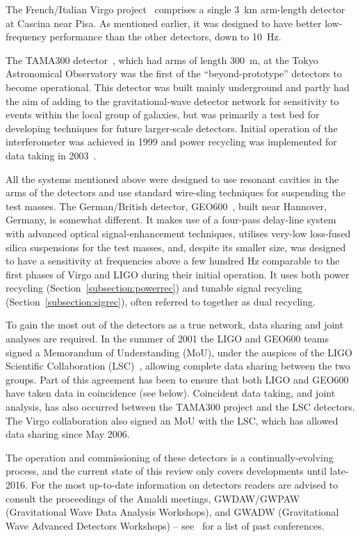 The French/Italian Virgo project~\cite{VIRGOweb, 2012JInst...7.3012A} comprises a single 3~km arm-length 
detector at Cascina near Pisa. As mentioned earlier, it was designed to have better low-frequency performance 
than the other detectors, down to 10~Hz.

The TAMA300 detector~\cite{TAMAweb}, which had arms of length 300~m, at the Tokyo Astronomical Observatory 
was the first of the ``beyond-prototype'' detectors to become operational. This detector was built mainly 
underground and partly had the aim of adding to the gravitational-wave detector network for sensitivity to 
events within the local group of galaxies, but was primarily a test bed for developing techniques for future 
larger-scale detectors. Initial operation of the interferometer was achieved in 1999 and power recycling was
implemented for data taking in 2003~\cite{Arai:2003}.

All the systems mentioned above were designed to use resonant cavities in the arms of the detectors and use 
standard wire-sling techniques for suspending the test masses. The German/British detector, 
GEO600~\cite{GEOweb}, built near Hannover, Germany, is somewhat different. It makes use of a four-pass 
delay-line system with advanced optical signal-enhancement techniques, utilises very-low loss-fused silica 
suspensions for the test masses, and, despite its smaller size, was designed to have a sensitivity at 
frequencies above a few hundred Hz comparable to the first phases of Virgo and LIGO during their initial 
operation. It uses both power recycling (Section~\ref{subsection:powerrec}) and tunable signal recycling 
(Section~\ref{subsection:sigrec}), often referred to together as dual recycling.

To gain the most out of the detectors as a true network, data sharing and joint analyses are required. In the 
summer of 2001 the LIGO and GEO600 teams signed a Memorandum of Understanding (MoU), under the auspices of 
the LIGO Scientific Collaboration (LSC)~\cite{LSCweb}, allowing complete data sharing between the two groups. 
Part of this agreement has been to ensure that both LIGO and GEO600 have taken data in coincidence (see 
below). Coincident data taking, and joint analysis, has also occurred between the TAMA300 project and the LSC
detectors. The Virgo collaboration also signed an MoU with the LSC, which has allowed data sharing since May 
2006.

The operation and commissioning of these detectors is a continually-evolving process, and the current state 
of this review only covers developments until late-2016. For the most up-to-date information on detectors 
readers are advised to consult the proceedings of the Amaldi meetings, GWDAW/GWPAW (Gravitational
Wave Data Analysis Workshops), and GWADW (Gravitational Wave Advanced Detectors Workshops) -- 
see~\cite{confs} for a list of past conferences.

